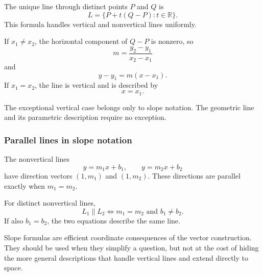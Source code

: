 \begin{theorembox}
The unique line through distinct points $P$ and $Q$ is
\[
\boxed{L=\{P+t(Q-P):t\in\mathbb R\}}.
\]
This formula handles vertical and nonvertical lines uniformly.
\end{theorembox}

\begin{derivationbox}
If $x_1\neq x_2$, the horizontal component of $Q-P$ is nonzero, so
\[
\boxed{m=\frac{y_2-y_1}{x_2-x_1}}
\]
and
\[
\boxed{y-y_1=m(x-x_1)}.
\]
If $x_1=x_2$, the line is vertical and is described by
\[
\boxed{x=x_1}.
\]
\end{derivationbox}

\begin{remarkbox}
The exceptional vertical case belongs only to slope notation. The geometric line
and its parametric description require no exception.
\end{remarkbox}

\subsubsection*{Parallel lines in slope notation}

\begin{proofbox}
The nonvertical lines
\[
y=m_1x+b_1,
\qquad
y=m_2x+b_2
\]
have direction vectors $(1,m_1)$ and $(1,m_2)$. These directions are parallel
exactly when $m_1=m_2$.
\end{proofbox}

\begin{theorembox}
For distinct nonvertical lines,
\[
\boxed{
L_1\parallel L_2
\iff
m_1=m_2\text{ and }b_1\neq b_2
}.
\]
If also $b_1=b_2$, the two equations describe the same line.
\end{theorembox}

\begin{remarkbox}
Slope formulas are efficient coordinate consequences of the vector
construction. They should be used when they simplify a question, but not at the
cost of hiding the more general descriptions that handle vertical lines and
extend directly to space.
\end{remarkbox}
